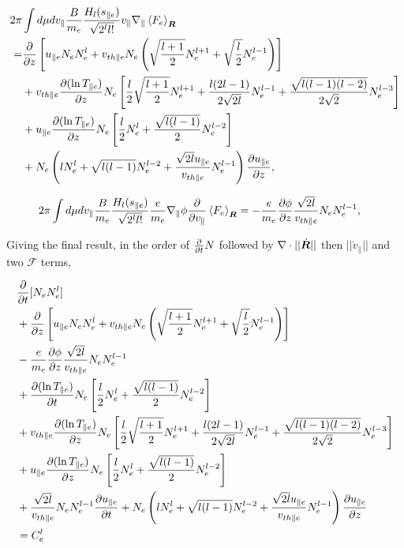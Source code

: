 \documentclass[final]{jpp}
\begin{document}
\begin{align}
2 \pi &\int d \mu d v_{\parallel} \frac{B}{m_e}\frac{H_l(s_{\parallel e})}{\sqrt{2^l l!}} v_\parallel \nabla_\parallel \left< F_e \right>_{\bm{R}} \nonumber\\
 =&\frac{\partial}{\partial z}\left[  u_{\parallel e} N_e N_e^l + v_{th\parallel e} N_e\left(\sqrt{\frac{l+1}{2}} N_e^{l+1}+ \sqrt{\frac{l}{2}} N_e^{l-1}  \right) \right] \nonumber\\
&+ v_{th\parallel e} \frac{\partial (\ln T_{\parallel e})}{\partial z} N_e \left[  \frac{l}{2}\sqrt{\frac{l+1}{2}} N_e^{l+1}+\frac{l(2l-1)}{2\sqrt{2l}} N_e^{l-1} + \frac{\sqrt{l(l-1)(l-2)}}{2\sqrt{2}} N_e^{l-3}  \right] \nonumber\\
&+ u_{\parallel e} \frac{\partial (\ln T_{\parallel e})}{\partial z} N_e\left[ \frac{l}{2}N_e^l+ \frac{\sqrt{l(l-1)}}{2}N_e^{l-2} \right] \nonumber\\
&+ N_e\left( lN_e^l+ \sqrt{l(l-1)}N_e^{l-2}+ \frac{\sqrt{2l} u_{\parallel e}}{v_{th\parallel e}}N_e^{l-1}\right) \frac{\partial u_{\parallel e}}{\partial z},
\end{align}


\begin{align}
2 \pi &\int d \mu d v_{\parallel} \frac{B}{m_e}\frac{H_l(s_{\parallel e})}{\sqrt{2^l l!}}  \frac{e}{m_e} \nabla_\parallel \phi \frac{\partial }{ \partial v_{\parallel}} \left< F_e \right>_{\bm{R}} = - \frac{e}{m_e} \frac{\partial \phi}{\partial z} \frac{\sqrt{2l}}{v_{th\parallel e}} N_e N_e^{l-1},
\end{align} 

Giving the final result, in the order of $ \frac{\partial}{\partial t} {N} $ followed by $\nabla\cdot||\dot{\bm{R}}||$ then $ ||\dot v_\parallel||$ and two $\mathcal{F}$ terms,

\begin{align}
 &\frac{\partial}{\partial t}[N_e N_e^l] \nonumber\\
 &+\frac{\partial}{\partial z}\left[ u_{\parallel e}N_eN_e^l +  v_{th\parallel e} N_e\left(\sqrt{\frac{l+1}{2}} N_e^{l+1}+ \sqrt{\frac{l}{2}} N_e^{l-1}  \right) \right] \nonumber\\
&- \frac{e}{m_e} \frac{\partial \phi}{\partial z} \frac{\sqrt{2l}}{v_{th\parallel e}} N_e N_e^{l-1}\nonumber\\
&+ \frac{\partial (\ln T_{\parallel e} )}{\partial t} N_e \left[ \frac{l}{2}N_e^l+ \frac{\sqrt{l(l-1)}}{2}  N_e^{l-2} \right] \nonumber\\
&+ v_{th\parallel e} \frac{\partial(\ln T_{\parallel e})}{\partial z}N_e \left[  \frac{l}{2}\sqrt{\frac{l+1}{2}} N_e^{l+1}+\frac{l(2l-1)}{2\sqrt{2l}} N_e^{l-1} + \frac{\sqrt{l(l-1)(l-2)}}{2\sqrt{2}} N_e^{l-3}  \right] \nonumber \\
&+ u_{\parallel e} \frac{\partial (\ln T_{\parallel e})}{\partial z} N_e\left[ \frac{l}{2}N_e^l+ \frac{\sqrt{l(l-1)}}{2}N_e^{l-2} \right] \nonumber\\
& + \frac{\sqrt{2l}}{v_{th \parallel e}}  N_e N_e^{l-1} \frac{\partial u_{\parallel e}}{\partial t} + N_e\left( lN_e^l +\sqrt{l(l-1)}N_e^{l-2}+  \frac{\sqrt{2l} u_{\parallel e}}{v_{th\parallel e}} N_e^{l-1} \right) \frac{\partial u_{\parallel e}}{\partial z} \nonumber\\
&= C_e^l 
\end{align}
\end{document}
